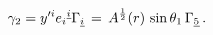 \begin{equation}
\gamma _2=y'^ie_i{}^{\underline{i}}\Gamma _{\underline{i}}\, =\,
A^{1\over 2}(r)\, \sin{\theta_1} \, \Gamma_{\underline{5}} \,.
\end{equation}

